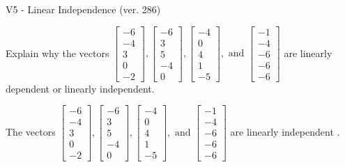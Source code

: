 \begin{exercise}
  \begin{exerciseTitle}V5 - Linear Independence (ver. 286)\end{exerciseTitle}
  \begin{exerciseStatement}
    Explain why the vectors \(\left[\begin{array}{r}
-6 \\
-4 \\
3 \\
0 \\
-2
\end{array}\right] , \left[\begin{array}{r}
-6 \\
3 \\
5 \\
-4 \\
0
\end{array}\right] , \left[\begin{array}{r}
-4 \\
0 \\
4 \\
1 \\
-5
\end{array}\right] , \text{ and } \left[\begin{array}{r}
-1 \\
-4 \\
-6 \\
-6 \\
-6
\end{array}\right]\) are linearly dependent or linearly independent.	


  \end{exerciseStatement}
  \begin{exerciseAnswer}
   The vectors \(\left[\begin{array}{r}
-6 \\
-4 \\
3 \\
0 \\
-2
\end{array}\right] , \left[\begin{array}{r}
-6 \\
3 \\
5 \\
-4 \\
0
\end{array}\right] , \left[\begin{array}{r}
-4 \\
0 \\
4 \\
1 \\
-5
\end{array}\right] , \text{ and } \left[\begin{array}{r}
-1 \\
-4 \\
-6 \\
-6 \\
-6
\end{array}\right]\) are 
  	 linearly independent  .
  


  \end{exerciseAnswer}
\end{exercise}